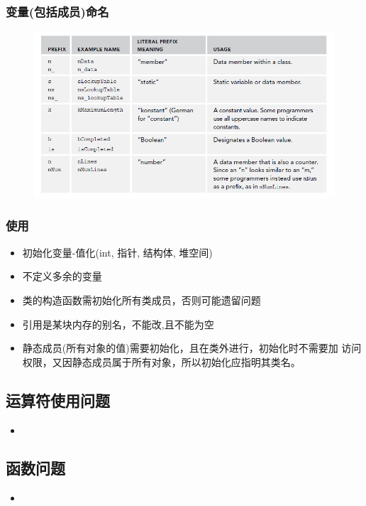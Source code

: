 \documentclass[UTF8,a4paper,12pt]{ctexbook} %
\begin{document}
			\subsubsection{变量(包括成员)命名}
				\begin{figure}[h]
					\centering
					\includegraphics[scale = 0.6]{Naming.png}
				\end{figure}

			\subsubsection{使用}
			\begin{itemize}
				\item 初始化变量-值化(int, 指针, 结构体,  堆空间)
				\item 不定义多余的变量  
				\item 类的构造函数需初始化所有类成员，否则可能遗留问题
				\item 引用是某块内存的别名，不能改,且不能为空
				\item 静态成员(所有对象的值)需要初始化，且在类外进行，初始化时不需要加 访问权限，又因静态成员属于所有对象，所以初始化应指明其类名。
			\end{itemize}
		\subsection{运算符使用问题}
			\begin{itemize}
				\item 
			\end{itemize}
		\subsection{函数问题}
			\begin{itemize}
				\item 
			\end{itemize}
\end{document}
